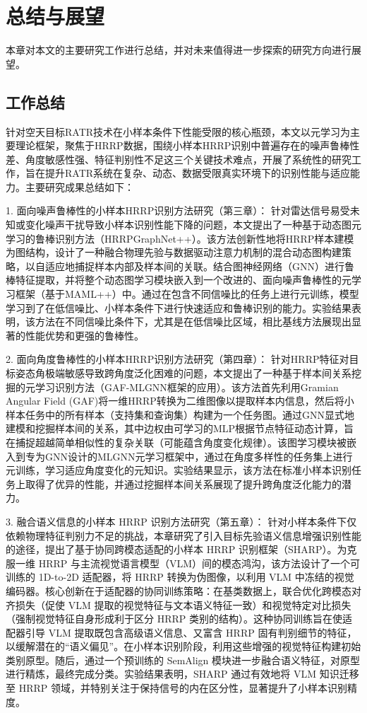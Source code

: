 \chapter{总结与展望}
\label{chap:conclusion}

本章对本文的主要研究工作进行总结，并对未来值得进一步探索的研究方向进行展望。

\section{工作总结}
\label{sec:summary}

针对空天目标RATR技术在小样本条件下性能受限的核心瓶颈，本文以元学习为主要理论框架，聚焦于HRRP数据，围绕小样本HRRP识别中普遍存在的噪声鲁棒性差、角度敏感性强、特征判别性不足这三个关键技术难点，开展了系统性的研究工作，旨在提升RATR系统在复杂、动态、数据受限真实环境下的识别性能与适应能力。主要研究成果总结如下：

1.  面向噪声鲁棒性的小样本HRRP识别方法研究（第三章）： 针对雷达信号易受未知或变化噪声干扰导致小样本识别性能下降的问题，本文提出了一种基于动态图元学习的鲁棒识别方法（HRRPGraphNet++）。该方法创新性地将HRRP样本建模为图结构，设计了一种融合物理先验与数据驱动注意力机制的混合动态图构建策略，以自适应地捕捉样本内部及样本间的关联。结合图神经网络（GNN）进行鲁棒特征提取，并将整个动态图学习模块嵌入到一个改进的、面向噪声鲁棒性的元学习框架（基于MAML++）中。通过在包含不同信噪比的任务上进行元训练，模型学习到了在低信噪比、小样本条件下进行快速适应和鲁棒识别的能力。实验结果表明，该方法在不同信噪比条件下，尤其是在低信噪比区域，相比基线方法展现出显著的性能优势和更强的鲁棒性。

2.  面向角度鲁棒性的小样本HRRP识别方法研究（第四章）： 针对HRRP特征对目标姿态角极端敏感导致跨角度泛化困难的问题，本文提出了一种基于样本间关系挖掘的元学习识别方法（GAF-MLGNN框架的应用）。该方法首先利用Gramian Angular Field (GAF)将一维HRRP转换为二维图像以提取样本内信息，然后将小样本任务中的所有样本（支持集和查询集）构建为一个任务图。通过GNN显式地建模和挖掘样本间的关系，其中边权由可学习的MLP根据节点特征动态计算，旨在捕捉超越简单相似性的复杂关联（可能蕴含角度变化规律）。该图学习模块被嵌入到专为GNN设计的MLGNN元学习框架中，通过在角度多样性的任务集上进行元训练，学习适应角度变化的元知识。实验结果显示，该方法在标准小样本识别任务上取得了优异的性能，并通过挖掘样本间关系展现了提升跨角度泛化能力的潜力。

3. 融合语义信息的小样本 HRRP 识别方法研究（第五章）： 针对小样本条件下仅依赖物理特征判别力不足的挑战，本章研究了引入目标先验语义信息增强识别性能的途径，提出了基于协同跨模态适配的小样本 HRRP 识别框架（SHARP）。为克服一维 HRRP 与主流视觉语言模型（VLM）间的模态鸿沟，该方法设计了一个可训练的 1D-to-2D 适配器，将 HRRP 转换为伪图像，以利用 VLM 中冻结的视觉编码器。核心创新在于适配器的协同训练策略：在基类数据上，联合优化跨模态对齐损失（促使 VLM 提取的视觉特征与文本语义特征一致）和视觉特定对比损失（强制视觉特征自身形成利于区分 HRRP 类别的结构）。这种协同训练旨在使适配器引导 VLM 提取既包含高级语义信息、又富含 HRRP 固有判别细节的特征，以缓解潜在的“语义偏见”。在小样本识别阶段，利用这些增强的视觉特征构建初始类别原型。随后，通过一个预训练的 SemAlign 模块进一步融合语义特征，对原型进行精炼，最终完成分类。实验结果表明，SHARP 通过有效地将 VLM 知识迁移至 HRRP 领域，并特别关注于保持信号的内在区分性，显著提升了小样本识别精度。


